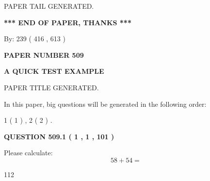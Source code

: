 \documentclass[12pt]{article}
\begin{document}
\vspace{2.0in} PAPER TAIL GENERATED.
   
   
   
   
\vspace{1.0in} 
{\textbf{\large{ *** END OF PAPER, THANKS *** }}} 
   
   
\hspace{1.0in} By: 
 239 ( 416 ,  613 )
   
   
   
   
\newpage 
\setcounter{page}{ 
   509001 } 
   
   
   
   
 {\textbf{ \Large{ PAPER NUMBER  509  }}}
   
   
\vspace{0.2in}
   
   
   
   
   
   
   
   
 \vspace{0.2in}
{\LARGE {\textbf{ A QUICK TEST EXAMPLE}}}
   
   
 PAPER TITLE GENERATED.
   
   
   
\vspace{0.2in}
   
In this paper, big questions will be generated in the following order: 
   
   
   1 ( 1 )
 ,
   2 ( 2 )
 .
  
\vspace{0.2in}
  
{\textbf{\Large{QUESTION
509.1 
 ( 1 , 1 , 101 )
}}}
  
  
 
Please calculate:
\begin{equation}
58 +  %
54 = \nonumber
\end{equation}
 
 
 
\noindent{}
 
 

112
 
 
\noindent{}
 
 

 
 
\end{document}
